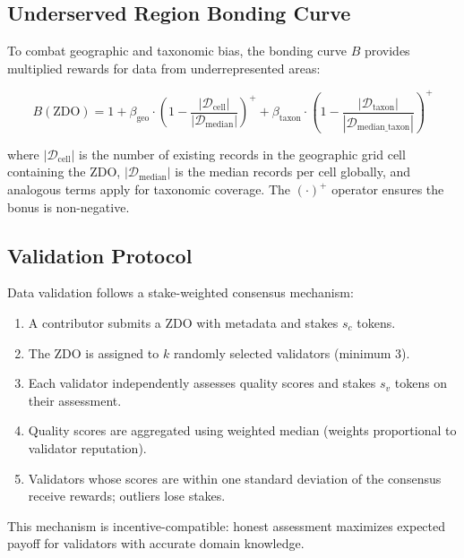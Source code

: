 \documentclass[11pt,a4paper]{article}
\begin{document}
\subsection{Underserved Region Bonding Curve}

To combat geographic and taxonomic bias, the bonding curve $B$ provides multiplied rewards for data from underrepresented areas:

\begin{equation}
    B(\text{ZDO}) = 1 + \beta_{\text{geo}} \cdot \left(1 - \frac{|\mathcal{D}_{\text{cell}}|}{|\mathcal{D}_{\text{median}}|}\right)^+ + \beta_{\text{taxon}} \cdot \left(1 - \frac{|\mathcal{D}_{\text{taxon}}|}{|\mathcal{D}_{\text{median\_taxon}}|}\right)^+
\end{equation}

\noindent where $|\mathcal{D}_{\text{cell}}|$ is the number of existing records in the geographic grid cell containing the ZDO, $|\mathcal{D}_{\text{median}}|$ is the median records per cell globally, and analogous terms apply for taxonomic coverage.
The $(\cdot)^+$ operator ensures the bonus is non-negative.

\subsection{Validation Protocol}

Data validation follows a stake-weighted consensus mechanism:

\begin{enumerate}[leftmargin=*]
    \item A contributor submits a ZDO with metadata and stakes $s_c$ tokens.
    \item The ZDO is assigned to $k$ randomly selected validators (minimum 3).
    \item Each validator independently assesses quality scores and stakes $s_v$ tokens on their assessment.
    \item Quality scores are aggregated using weighted median (weights proportional to validator reputation).
    \item Validators whose scores are within one standard deviation of the consensus receive rewards; outliers lose stakes.
\end{enumerate}

This mechanism is incentive-compatible: honest assessment maximizes expected payoff for validators with accurate domain knowledge.

\end{document}
